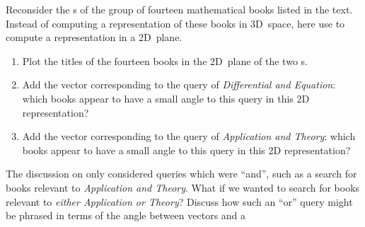 \begin{exercise}  
Reconsider the s of the group of fourteen mathematical books listed in the text. 
Instead of computing a representation of these books in 3D~space, here use  to compute a representation in a 2D~plane.
\begin{enumerate}
\item Plot the titles of the fourteen books in the 2D~plane of the two s.

\item Add the vector corresponding to the query of \emph{Differential and Equation}: which books appear to have a small angle to this query in this 2D representation?


\item Add the vector corresponding to the query of \emph{Application and Theory}: which books appear to have a small angle to this query in this 2D representation?

\end{enumerate}
\end{exercise}




\begin{exercise}  
The discussion on  only considered queries which were ``and'', such as a search for books relevant to \emph{Application and Theory}.
What if we wanted to search for books relevant to \emph{either Application or Theory}?
Discuss how such an ``or'' query might be phrased in terms of the angle between vectors and a 
\end{exercise}




